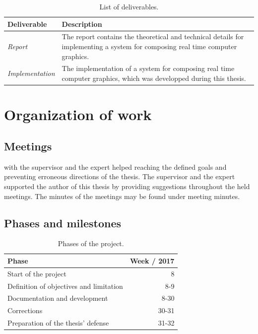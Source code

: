 \documentclass[%
    a4paper,
    nobib,   %
    openany  %
]{tufte-book}
\begin{document}
\begin{table}[h]
  \caption{List of deliverables.}
  \begin{tabularx}{\textwidth}{lX}
    \toprule
    \textbf{Deliverable} & \textbf{Description} \\
    \midrule
    \textit{Report} & The report contains the theoretical and technical details for
    implementing a system for composing real time computer graphics. \\
    \midrule
    \textit{Implementation} & The implementation of a system for composing real time
    computer graphics, which was developped during this thesis. \\
    \bottomrule
  \end{tabularx}
\end{table}

\section{Organization of work}
\label{sec:organization-of-work}

\subsection{Meetings}
\label{subsec:meetings}

 with the supervisor and the expert helped reaching
the defined goals and preventing erroneous directions of the thesis. The
supervisor and the expert supported the author of this thesis by providing
suggestions throughout the held meetings. The minutes of the meetings may be
found under meeting minutes. 

\subsection{Phases and milestones}
\label{subsec:project-phases-milestones}

\begin{table}[h]
  \caption{Phases of the project.}
  \begin{tabularx}{\textwidth}{Xr}
    \toprule
    \textbf{Phase}   & \textbf{Week / 2017} \\
    \midrule
    Start of the project & 8 \\
    Definition of objectives and limitation & 8-9 \\
    Documentation and development & 8-30 \\
    Corrections & 30-31 \\
    Preparation of the thesis' defense & 31-32 \\
    \bottomrule
  \end{tabularx}
\end{table}
\end{document}
